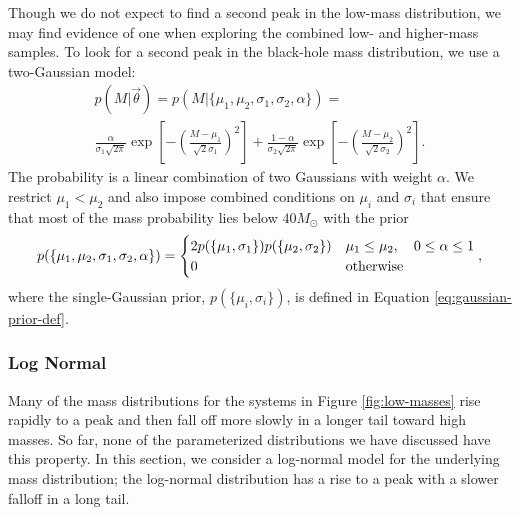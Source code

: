 \documentclass[preprint]{aastex}
\newcommand{\Msun}{M_\odot}
\newcommand{\vtheta}{\vec{\theta}}
\begin{document}
Though we do not expect to find a second peak in the low-mass
distribution, we may find evidence of one when exploring the combined
low- and higher-mass samples.  To look for a second peak in the
black-hole mass distribution, we use a two-Gaussian model:
\begin{multline}
  \label{eq:two-gaussian-def}
  p(M|\vtheta) = p(M|\{\mu_1, \mu_2, \sigma_1, \sigma_2, \alpha\}) = \\
  \frac{\alpha}{\sigma_1 \sqrt{2\pi}} \exp\left[ - \left( \frac{M -
        \mu_1}{\sqrt{2}\sigma_1} \right)^2 \right] + \frac{1-\alpha}{\sigma_2 \sqrt{2\pi}} \exp\left[ - \left( \frac{M -
        \mu_2}{\sqrt{2}\sigma_2} \right)^2 \right].
\end{multline}
The probability is a linear combination of two Gaussians with weight
$\alpha$.  We restrict $\mu_1 < \mu_2$ and also impose combined
conditions on $\mu_i$ and $\sigma_i$ that ensure that most of the mass
probability lies below $40 \Msun$ with the prior 
\begin{equation}
  p(\{\mu_1, \mu_2, \sigma_1, \sigma_2, \alpha\}) = 
  \begin{cases}
    2 p(\{\mu_1, \sigma_1\}) p(\{\mu_2, \sigma_2\}) & \mu_1 \leq
    \mu_2, \quad 0 \leq \alpha \leq 1 \\
    0 & \textnormal{otherwise}
  \end{cases},
\end{equation}
where the single-Gaussian prior, $p(\{\mu_i, \sigma_i\})$, is defined
in Equation \eqref{eq:gaussian-prior-def}.

\subsubsection{Log Normal}
\label{sec:log-normal}

Many of the mass distributions for the systems in Figure
\ref{fig:low-masses} rise rapidly to a peak and then fall off more
slowly in a longer tail toward high masses.  So far, none of the
parameterized distributions we have discussed have this property.  In
this section, we consider a log-normal model for the underlying mass
distribution; the log-normal distribution has a rise to a peak with a
slower falloff in a long tail.  
\end{document}

